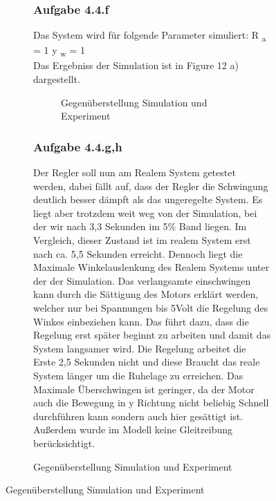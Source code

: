 \documentclass[10pt]{scrartcl}
\begin{document}
\begin{figure}[H]
\begin{figure}
\subsubsection{Aufgabe 4.4.f}	
Das System wird für folgende Parameter simuliert:
R \textsubscript{a} = 1
 y \textsubscript{w} = 1\\
Das Ergebniss der Simulation ist in Figure 12 a) dargestellt. 
\begin{figure} [H]
\caption{ Gegenüberstellung Simulation und Experiment} 
\end{figure}
\subsubsection{Aufgabe 4.4.g,h}	
Der Regler soll nun am Realem System getestet werden, dabei fällt auf, dass
der Regler die Schwingung deutlich besser  dämpft  als das ungeregelte System. Es liegt aber trotzdem weit weg von der Simulation, bei der wir nach 3,3 Sekunden im 5\% Band liegen. Im Vergleich, dieser Zustand ist im realem System erst nach ca. 5,5 Sekunden erreicht. Dennoch liegt die Maximale Winkelauslenkung des Realem Systems unter der der Simulation. Das verlangsamte einschwingen kann durch die Sättigung des Motors erklärt werden, welcher nur bei Spannungen bis 5Volt die Regelung des Winkes einbeziehen kann. Das führt dazu, dass die Regelung erst später beginnt zu arbeiten und damit das System langsamer wird. Die Regelung arbeitet die Erste 2,5 Sekunden nicht und diese Braucht das reale System länger um die Ruhelage zu erreichen. Das Maximale Überschwingen ist geringer, da der Motor auch die Bewegung in y Richtung nicht beliebig Schnell durchführen kann sondern auch hier gesättigt ist. Außerdem wurde im Modell keine Gleitreibung berücksichtigt.\\

\end{figure}
\end{figure}
\end{document}
